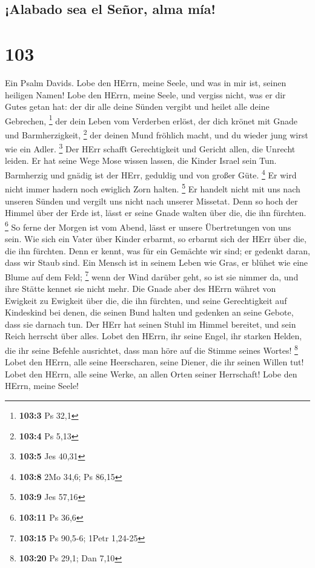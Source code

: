 \hypertarget{alabado-sea-el-seuxf1or-alma-muxeda}{%
\subsection{¡Alabado sea el Señor, alma
mía!}\label{alabado-sea-el-seuxf1or-alma-muxeda}}

\hypertarget{section-102}{%
\section{103}\label{section-102}}

 Ein Psalm Davids. Lobe den HErrn, meine Seele, und was in
mir ist, seinen heiligen Namen!  Lobe den HErrn, meine
Seele, und vergiss nicht, was er dir Gutes getan hat:  der
dir alle deine Sünden vergibt und heilet alle deine Gebrechen,
\footnote{\textbf{103:3} Ps 32,1}  der dein Leben vom
Verderben erlöst, der dich krönet mit Gnade und Barmherzigkeit,
\footnote{\textbf{103:4} Ps 5,13}  der deinen Mund
fröhlich macht, und du wieder jung wirst wie ein Adler. \footnote{\textbf{103:5}
  Jes 40,31}  Der HErr schafft Gerechtigkeit und Gericht
allen, die Unrecht leiden.  Er hat seine Wege Mose wissen
lassen, die Kinder Israel sein Tun.  Barmherzig und gnädig
ist der HErr, geduldig und von großer Güte. \footnote{\textbf{103:8} 2Mo
  34,6; Ps 86,15}  Er wird nicht immer hadern noch
ewiglich Zorn halten. \footnote{\textbf{103:9} Jes 57,16}
 Er handelt nicht mit uns nach unseren Sünden und vergilt
uns nicht nach unserer Missetat.  Denn so hoch der Himmel
über der Erde ist, lässt er seine Gnade walten über die, die ihn
fürchten. \footnote{\textbf{103:11} Ps 36,6}  So ferne
der Morgen ist vom Abend, lässt er unsere Übertretungen von uns sein.
 Wie sich ein Vater über Kinder erbarmt, so erbarmt sich
der HErr über die, die ihn fürchten.  Denn er kennt, was
für ein Gemächte wir sind; er gedenkt daran, dass wir Staub sind.
 Ein Mensch ist in seinem Leben wie Gras, er blühet wie
eine Blume auf dem Feld; \footnote{\textbf{103:15} Ps 90,5-6; 1Petr
  1,24-25}  wenn der Wind darüber geht, so ist sie nimmer
da, und ihre Stätte kennet sie nicht mehr.  Die Gnade
aber des HErrn währet von Ewigkeit zu Ewigkeit über die, die ihn
fürchten, und seine Gerechtigkeit auf Kindeskind  bei
denen, die seinen Bund halten und gedenken an seine Gebote, dass sie
darnach tun.  Der HErr hat seinen Stuhl im Himmel
bereitet, und sein Reich herrscht über alles.  Lobet den
HErrn, ihr seine Engel, ihr starken Helden, die ihr seine Befehle
ausrichtet, dass man höre auf die Stimme seines Wortes! \footnote{\textbf{103:20}
  Ps 29,1; Dan 7,10}  Lobet den HErrn, alle seine
Heerscharen, seine Diener, die ihr seinen Willen tut! 
Lobet den HErrn, alle seine Werke, an allen Orten seiner Herrschaft!
Lobe den HErrn, meine Seele!


